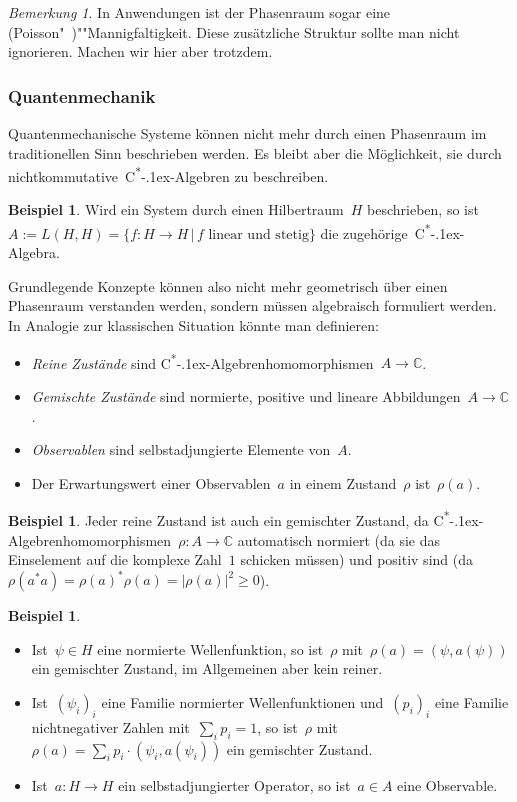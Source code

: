 \documentclass[a4paper,ngerman,12pt]{scrartcl}
\theoremstyle{definition}
\newtheorem{bsp}[defn]{Beispiel}
\theoremstyle{plain}
\theoremstyle{remark}
\newtheorem{bem}[defn]{Bemerkung}
\newcommand{\CC}{\mathbb{C}}
\newcommand{\csalgebra}{C\textsuperscript{*}\kern-.1ex-Algebra}
\newcommand{\csalgebren}{C\textsuperscript{*}\kern-.1ex-Alge\-bren}
\renewcommand{\_}{\mathpunct{.}\,}
\newcommand{\?}{\,{:}\,}
\begin{document}
\begin{bem}In Anwendungen ist der Phasenraum sogar eine
(Poisson"~)""Mannigfaltigkeit. Diese zusätzliche Struktur sollte man nicht
ignorieren. Machen wir hier aber trotzdem.\end{bem}


\subsubsection*{Quantenmechanik}

Quantenmechanische Systeme können nicht mehr durch einen Phasenraum im
traditionellen Sinn beschrieben werden. Es bleibt aber die Möglichkeit, sie
durch nichtkommutative~\csalgebren{} zu beschreiben.

\begin{bsp}Wird ein System durch einen Hilbertraum~$H$ beschrieben, so ist~$A
:= L(H,H) = \{ f : H \to H \,|\, \text{$f$ linear und stetig} \}$ die
zugehörige~\csalgebra.\end{bsp}

Grundlegende Konzepte können also nicht mehr geometrisch über einen Phasenraum
verstanden werden, sondern müssen algebraisch formuliert werden. In Analogie
zur klassischen Situation könnte man definieren:
\begin{itemize}
\item \emph{Reine Zustände} sind \csalgebren{}\-homo\-mor\-phis\-men~$A \to
\CC$.
\item \emph{Gemischte Zustände} sind normierte, positive und lineare
Abbildungen~$A \to \CC$.
\item \emph{Observablen} sind selbstadjungierte Elemente von~$A$.
\item Der Erwartungswert einer Observablen~$a$ in einem Zustand~$\rho$
ist~$\rho(a)$.
\end{itemize}

\begin{bsp}Jeder reine Zustand ist auch ein gemischter Zustand, da
\csalgebren{}\-homo\-mor\-phis\-men~$\rho : A \to \CC$ automatisch normiert (da sie das
Einselement auf die komplexe Zahl~$1$ schicken müssen) und positiv sind
(da~$\rho(a^* a) = \rho(a)^* \rho(a) = |\rho(a)|^2 \geq 0$).\end{bsp}

\begin{bsp}\begin{itemize}
\item Ist~$\psi \in H$ eine normierte Wellenfunktion, so ist~$\rho$
mit~$\rho(a) = (\psi, a(\psi))$ ein gemischter Zustand, im Allgemeinen aber
kein reiner.
\item Ist~$(\psi_i)_i$ eine Familie normierter Wellenfunktionen und~$(p_i)_i$
eine Familie nichtnegativer Zahlen mit~$\sum_i p_i = 1$, so ist~$\rho$
mit~$\rho(a) = \sum_i p_i \cdot (\psi_i, a(\psi_i))$ ein gemischter Zustand.
\item Ist~$a : H \to H$ ein selbstadjungierter Operator, so ist~$a \in A$ eine
Observable.
\end{itemize}
\end{bsp}
\end{document}
